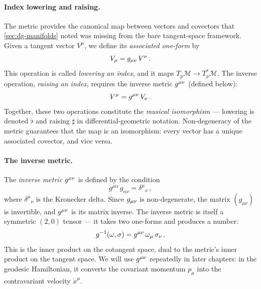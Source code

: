 \paragraph{Index lowering and raising.}

The metric provides the canonical map between vectors and covectors that
\cref{sec:dg-manifolds} noted was missing from the bare tangent-space
framework.  Given a tangent vector $V^\mu$, we define its \emph{associated
one-form} by
%
\begin{equation}
  V_\mu = g_{\mu\nu}\, V^\nu \,.
  \label{eq:index-lower}
\end{equation}
%
This operation is called \emph{lowering an index}, and it maps
$T_p\mathcal{M} \to T^*_p\mathcal{M}$.  The inverse operation,
\emph{raising an index}, requires the inverse metric $g^{\mu\nu}$
(defined below):
%
\begin{equation}
  V^\mu = g^{\mu\nu}\, V_\nu \,.
  \label{eq:index-raise}
\end{equation}
%
Together, these two operations constitute the \emph{musical isomorphism} ---
lowering is denoted $\flat$ and raising $\sharp$ in differential-geometric
notation.  Non-degeneracy of the metric guarantees that the map is an
isomorphism: every vector has a unique associated covector, and vice versa.


\paragraph{The inverse metric.}

The \emph{inverse metric} $g^{\mu\nu}$ is defined by the condition
%
\begin{equation}
  g^{\mu\alpha}\, g_{\alpha\nu} = \delta^\mu{}_\nu \,,
  \label{eq:inverse-metric}
\end{equation}
%
where $\delta^\mu{}_\nu$ is the Kronecker delta.  Since $g_{\mu\nu}$ is
non-degenerate, the matrix $(g_{\mu\nu})$ is invertible, and $g^{\mu\nu}$
is its matrix inverse.  The inverse metric is itself a symmetric $(2,0)$
tensor --- it takes two one-forms and produces a number:
%
\begin{equation}
  g^{-1}(\omega, \sigma) = g^{\mu\nu}\,\omega_\mu\,\sigma_\nu \,.
  \label{eq:inverse-metric-bilinear}
\end{equation}
%
This is the inner product on the cotangent space, dual to the metric's inner
product on the tangent space.  We will use $g^{\mu\nu}$ repeatedly in later
chapters: in the geodesic Hamiltonian, it converts the covariant momentum
$p_\mu$ into the contravariant velocity $\dot{x}^\mu$.

